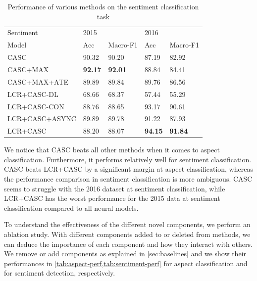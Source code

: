\documentclass[american, oneside]{ecsgdp}
\begin{document}
\begin{table}[htbp]
\centering
\caption{Performance of various methods on the sentiment classification task}
\label{tab:sentiment-perf}
\begin{tabular}{@{\extracolsep{4pt}}lllll@{}}
\hline
Sentiment      & 2015           &                & 2016           &                \\ \cline{2-3} \cline{4-5}
Model          & Acc            & Macro-F1       & Acc            & Macro-F1       \\ \hline
CASC           & 90.32          & 90.20          & 87.19          & 82.92          \\
CASC+MAX       & \textbf{92.17} & \textbf{92.01} & 88.84          & 84.41          \\
CASC+MAX+ATE   & 89.89          & 89.84          & 89.76          & 86.56          \\
LCR+CASC-DL    & 68.66          & 68.37          & 57.44          & 55.29          \\
LCR+CASC-CON   & 88.76          & 88.65          & 93.17          & 90.61          \\
LCR+CASC+ASYNC & 89.89	        & 89.78	         & 91.22	      & 87.93          \\
LCR+CASC       & 88.20          & 88.07          & \textbf{94.15} & \textbf{91.84} \\ \hline
\end{tabular}%
\end{table}

We notice that CASC beats all other methods when it comes to aspect classification. Furthermore, it performs relatively well for sentiment classification. CASC beats LCR+CASC by a significant margin at aspect classification, whereas the performance comparison in sentiment classification is more ambiguous. CASC seems to struggle with the 2016 dataset at sentiment classification, while LCR+CASC has the worst performance for the 2015 data at sentiment classification compared to all neural models.

To understand the effectiveness of the different novel components, we perform an ablation study. With different components added to or deleted from methods, we can deduce the importance of each component and how they interact with others. We remove or add components as explained in \cref{sec:baselines} and we show their performances in \cref{tab:aspect-perf,tab:sentiment-perf} for aspect classification and for sentiment detection, respectively.
\end{document}
